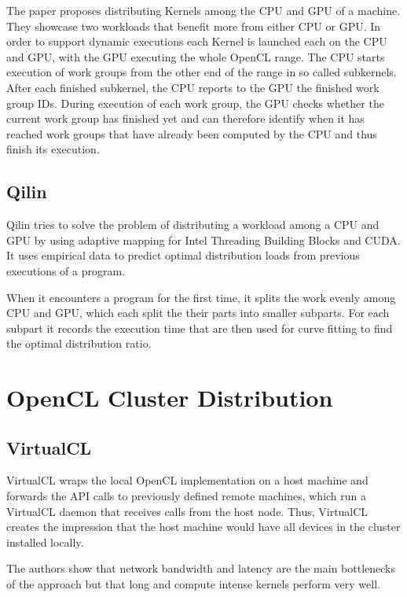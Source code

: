 The paper proposes distributing Kernels among the CPU and GPU of a machine. They showcase two workloads that benefit more from either CPU or GPU. In order to support dynamic executions each Kernel is launched each on the CPU and GPU, with the GPU executing the whole OpenCL range. The CPU starts execution of work groups from the other end of the range in so called subkernels. After each finished subkernel, the CPU reports to the GPU the finished work group IDs. During execution of each work group, the GPU checks whether the current work group has finished yet and can therefore identify when it has reached work groups that have already been computed by the CPU and thus finish its execution.

\subsection{Qilin\cite{qilin}}

Qilin tries to solve the problem of distributing a workload among a CPU and GPU by using adaptive mapping for Intel Threading Building Blocks and CUDA. It uses empirical data to predict optimal distribution loads from previous executions of a program.

When it encounters a program for the first time, it splits the work evenly among CPU and GPU, which each split the their parts into smaller subparts. For each subpart it records the execution time that are then used for curve fitting to find the optimal distribution ratio.

\section{OpenCL Cluster Distribution}

\subsection{VirtualCL\cite{virtualcl}}

VirtualCL wraps the local OpenCL implementation on a host machine and forwards the API calls to previously defined remote machines, which run a VirtualCL daemon that receives calls from the host node. Thus, VirtualCL creates the impression that the host machine would have all devices in the cluster installed locally.

The authors show that network bandwidth and latency are the main bottlenecks of the approach but that long and compute intense kernels perform very well.

